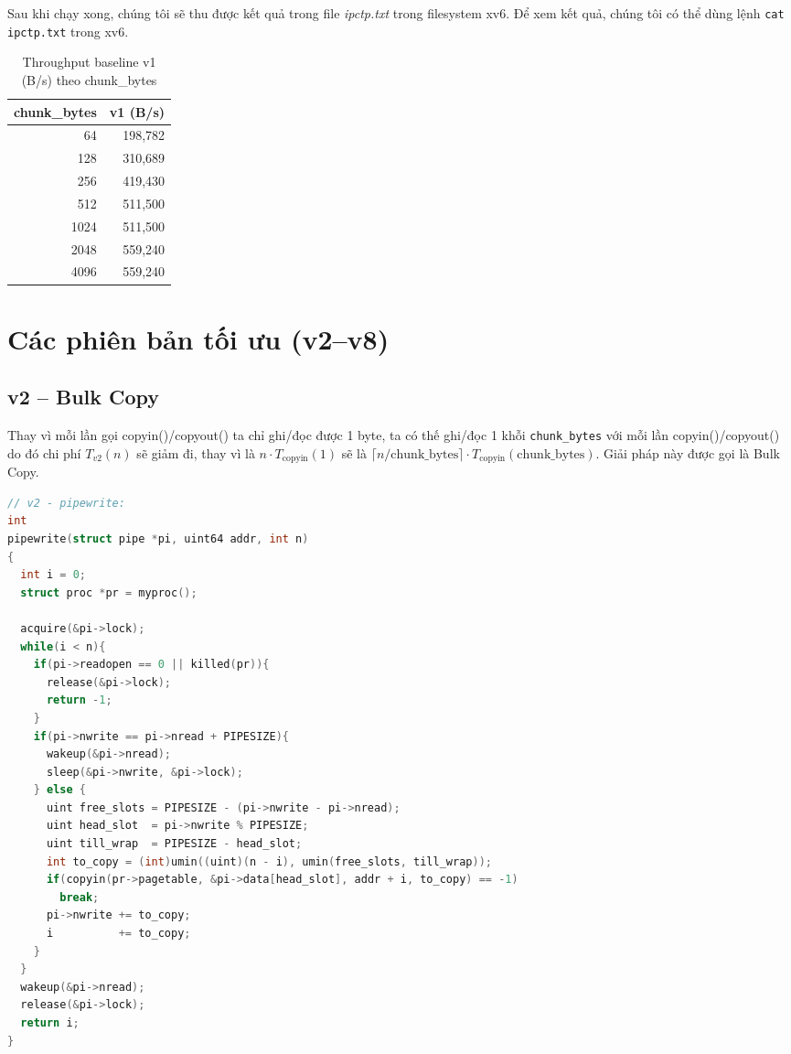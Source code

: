 \documentclass[12pt,a4paper]{article}
\newcommand{\code}[1]{\texttt{#1}}
\begin{document}
Sau khi chạy xong, chúng tôi sẽ thu được kết quả trong file \textit{ipctp.txt} trong filesystem xv6. Để xem kết quả, chúng tôi có thể dùng lệnh \code{cat ipctp.txt} trong xv6.

\begin{table}[H]
\centering
\caption{Throughput baseline v1 (B/s) theo chunk\_bytes}
\begin{tabular}{rr}
\toprule
\textbf{chunk\_bytes} & \textbf{v1 (B/s)} \\
\midrule
64   & 198,782 \\
128  & 310,689 \\
256  & 419,430 \\
512  & 511,500 \\
1024 & 511,500 \\
2048 & 559,240 \\
4096 & 559,240 \\
\bottomrule
\end{tabular}
\end{table}


\section{Các phiên bản tối ưu (v2--v8)}
\label{sec:versions}

\subsection{v2 -- Bulk Copy}

Thay vì mỗi lần gọi copyin()/copyout() ta chỉ ghi/đọc được 1 byte, ta có thế ghi/đọc 1 khỗi \code{chunk\_bytes}
với mỗi lần copyin()/copyout() do đó chi phí $T_{v2}(n)$ sẽ giảm đi, thay vì là $n \cdot T_{\text{copyin}}(1)$ sẽ là $\lceil n/\text{chunk\_bytes} \rceil \cdot T_{\text{copyin}}(\text{chunk\_bytes})$.
Giải pháp này được gọi là Bulk Copy.
\begin{lstlisting}[caption={v2 -- pipewrite thay byte-by-byte bằng bulk copyin}, language=C]
// v2 - pipewrite:
int
pipewrite(struct pipe *pi, uint64 addr, int n)
{
  int i = 0;
  struct proc *pr = myproc();

  acquire(&pi->lock);
  while(i < n){
    if(pi->readopen == 0 || killed(pr)){
      release(&pi->lock);
      return -1;
    }
    if(pi->nwrite == pi->nread + PIPESIZE){
      wakeup(&pi->nread);
      sleep(&pi->nwrite, &pi->lock);
    } else {
      uint free_slots = PIPESIZE - (pi->nwrite - pi->nread);
      uint head_slot  = pi->nwrite % PIPESIZE;
      uint till_wrap  = PIPESIZE - head_slot;
      int to_copy = (int)umin((uint)(n - i), umin(free_slots, till_wrap));
      if(copyin(pr->pagetable, &pi->data[head_slot], addr + i, to_copy) == -1)
        break;
      pi->nwrite += to_copy;
      i          += to_copy;
    }
  }
  wakeup(&pi->nread);
  release(&pi->lock);
  return i;
}
\end{lstlisting}
\end{document}
